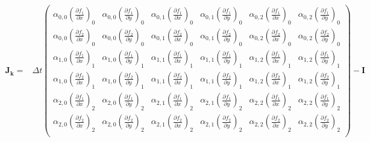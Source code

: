 \documentclass[10pt,a4paper]{article}
\newcommand{\bvec}[1]{\mathbf{#1}}
\begin{document}
\begin{align*}
  \bvec{J}_\bvec{k} =& \Delta t\begin{pmatrix}
    \alpha_{0,0} \left( \frac{\partial f_1}{\partial x} \right)_0 & \alpha_{0,0} \left( \frac{\partial f_1}{\partial y} \right)_0 &  \alpha_{0,1} \left( \frac{\partial f_1}{\partial x} \right)_0 & \alpha_{0,1} \left( \frac{\partial f_1}{\partial y} \right)_0 &  \alpha_{0,2} \left( \frac{\partial f_1}{\partial x} \right)_0 & \alpha_{0,2} \left( \frac{\partial f_1}{\partial y} \right)_0 \\
    \alpha_{0,0} \left( \frac{\partial f_2}{\partial x} \right)_0 & \alpha_{0,0} \left( \frac{\partial f_2}{\partial y} \right)_0 &  \alpha_{0,1} \left( \frac{\partial f_2}{\partial x} \right)_0 & \alpha_{0,1} \left( \frac{\partial f_2}{\partial y} \right)_0 &  \alpha_{0,2} \left( \frac{\partial f_2}{\partial x} \right)_0 & \alpha_{0,2} \left( \frac{\partial f_2}{\partial y} \right)_0 \\
    \alpha_{1,0} \left( \frac{\partial f_1}{\partial x} \right)_1 & \alpha_{1,0} \left( \frac{\partial f_1}{\partial y} \right)_1 &  \alpha_{1,1} \left( \frac{\partial f_1}{\partial x} \right)_1 & \alpha_{1,1} \left( \frac{\partial f_1}{\partial y} \right)_1 &  \alpha_{1,2} \left( \frac{\partial f_1}{\partial x} \right)_1 & \alpha_{1,2} \left( \frac{\partial f_1}{\partial y} \right)_1 \\
    \alpha_{1,0} \left( \frac{\partial f_2}{\partial x} \right)_1 & \alpha_{1,0} \left( \frac{\partial f_2}{\partial y} \right)_1 &  \alpha_{1,1} \left( \frac{\partial f_2}{\partial x} \right)_1 & \alpha_{1,1} \left( \frac{\partial f_2}{\partial y} \right)_1 &  \alpha_{1,2} \left( \frac{\partial f_2}{\partial x} \right)_1 & \alpha_{1,2} \left( \frac{\partial f_2}{\partial y} \right)_1 \\
    \alpha_{2,0} \left( \frac{\partial f_1}{\partial x} \right)_2 & \alpha_{2,0} \left( \frac{\partial f_1}{\partial y} \right)_2 &  \alpha_{2,1} \left( \frac{\partial f_1}{\partial x} \right)_2 & \alpha_{2,1} \left( \frac{\partial f_1}{\partial y} \right)_2 &  \alpha_{2,2} \left( \frac{\partial f_1}{\partial x} \right)_2 & \alpha_{2,2} \left( \frac{\partial f_1}{\partial y} \right)_2 \\
    \alpha_{2,0} \left( \frac{\partial f_2}{\partial x} \right)_2 & \alpha_{2,0} \left( \frac{\partial f_2}{\partial y} \right)_2 &  \alpha_{2,1} \left( \frac{\partial f_2}{\partial x} \right)_2 & \alpha_{2,1} \left( \frac{\partial f_2}{\partial y} \right)_2 &  \alpha_{2,2} \left( \frac{\partial f_2}{\partial x} \right)_2 & \alpha_{2,2} \left( \frac{\partial f_2}{\partial y} \right)_2 \\    
   \end{pmatrix} - \bvec{I}
\end{align*}
\end{document}
